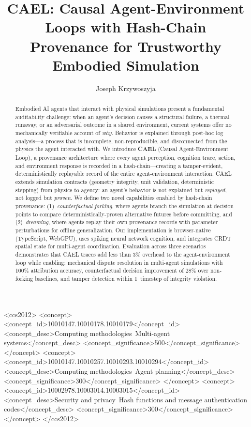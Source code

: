 \documentclass[sigconf,nonacm]{acmart}
\begin{document}
\title{CAEL: Causal Agent-Environment Loops with Hash-Chain Provenance for Trustworthy Embodied Simulation}

\author{Joseph Krzywoszyja}

\begin{abstract}
Embodied AI agents that interact with physical simulations present a fundamental
auditability challenge: when an agent's decision causes a structural failure,
a thermal runaway, or an adversarial outcome in a shared environment, current
systems offer no mechanically verifiable account of \emph{why}. Behavior is
explained through post-hoc log analysis---a process that is incomplete,
non-reproducible, and disconnected from the physics the agent interacted with.
We introduce \textbf{CAEL} (Causal Agent-Environment Loop), a provenance
architecture where every agent perception, cognition trace, action, and
environment response is recorded in a hash-chain---creating a tamper-evident,
deterministically replayable record of the entire agent-environment interaction.
CAEL extends simulation contracts (geometry integrity, unit validation,
deterministic stepping) from physics to agency: an agent's behavior is not
explained but \emph{replayed}, not logged but \emph{proven}. We define two
novel capabilities enabled by hash-chain provenance: (1)~\emph{counterfactual
forking}, where agents branch the simulation at decision points to compare
deterministically-proven alternative futures before committing, and
(2)~\emph{dreaming}, where agents replay their own provenance records with
parameter perturbations for offline generalization. Our implementation is
browser-native (TypeScript, WebGPU), uses spiking neural network cognition,
and integrates CRDT spatial state for multi-agent coordination. Evaluation
across three scenarios demonstrates that CAEL traces add less than
3\% overhead to the agent-environment loop while enabling: mechanical
dispute resolution in multi-agent simulations with 100\% attribution
accuracy, counterfactual decision improvement of 28\% over
non-forking baselines, and tamper detection within 1~timestep
of integrity violation.
\end{abstract}

\begin{CCSXML}
<ccs2012>
  <concept>
    <concept_id>10010147.10010178.10010179</concept_id>
    <concept_desc>Computing methodologies~Multi-agent systems</concept_desc>
    <concept_significance>500</concept_significance>
  </concept>
  <concept>
    <concept_id>10010147.10010257.10010293.10010294</concept_id>
    <concept_desc>Computing methodologies~Agent planning</concept_desc>
    <concept_significance>300</concept_significance>
  </concept>
  <concept>
    <concept_id>10002978.10003014.10003015</concept_id>
    <concept_desc>Security and privacy~Hash functions and message authentication codes</concept_desc>
    <concept_significance>300</concept_significance>
  </concept>
</ccs2012>
\end{CCSXML}
\end{document}
